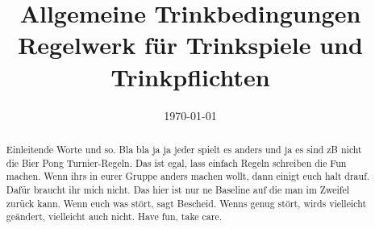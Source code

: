 \documentclass{report}
\title{\Huge Allgemeine Trinkbedingungen \\[2ex] \Large Regelwerk für Trinkspiele und Trinkpflichten}
\date{\today}
\begin{document}


\maketitle
\begin{abstract}
	Einleitende Worte und so.
	Bla bla ja ja jeder spielt es anders und ja es sind zB nicht die Bier Pong Turnier-Regeln.
	Das ist egal, lass einfach Regeln schreiben die Fun machen.
	Wenn ihrs in eurer Gruppe anders machen wollt, dann einigt euch halt drauf.
	Dafür braucht ihr mich nicht.
	Das hier ist nur ne Baseline auf die man im Zweifel zurück kann.
	Wenn euch was stört, sagt Bescheid.
	Wenns genug stört, wirds vielleicht geändert, vielleicht auch nicht.
	Have fun, take care.
\end{abstract}
\tableofcontents
\cleardoublepage
{}











\end{document}
